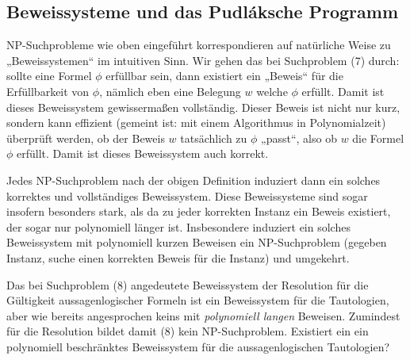 \subsection*{Beweissysteme und das Pudláksche Programm}

NP-Suchprobleme wie oben eingeführt korrespondieren auf natürliche Weise zu „Beweissystemen“ im intuitiven Sinn. Wir gehen das bei Suchproblem (7) durch: sollte eine Formel $\phi$ erfüllbar sein, dann existiert ein „Beweis“ für die Erfüllbarkeit von $\phi$, nämlich eben eine Belegung $w$ welche $\phi$ erfüllt. Damit ist dieses Beweissystem gewissermaßen vollständig.
Dieser Beweis ist nicht nur kurz, sondern kann effizient (gemeint ist: mit einem Algorithmus in Polynomialzeit) überprüft werden, ob der Beweis $w$ tatsächlich zu $\phi$ „passt“, also ob $w$ die Formel $\phi$ erfüllt. Damit ist dieses Beweissystem auch korrekt.

Jedes NP-Suchproblem nach der obigen Definition induziert dann ein solches korrektes und vollständiges Beweissystem. Diese Beweissysteme sind sogar insofern besonders stark, als da zu jeder korrekten Instanz ein Beweis existiert, der sogar nur polynomiell länger ist.
Insbesondere induziert ein solches Beweissystem mit polynomiell kurzen Beweisen ein NP-Suchproblem (gegeben Instanz, suche einen korrekten Beweis für die Instanz) und umgekehrt.

Das bei Suchproblem (8) angedeutete Beweissystem der Resolution für die Gültigkeit aussagenlogischer Formeln ist ein Beweissystem für die Tautologien, aber wie bereits angesprochen keins mit \emph{polynomiell langen} Beweisen. Zumindest für die Resolution bildet damit (8) kein NP-Suchproblem. 
Existiert ein ein polynomiell beschränktes Beweissystem für die aussagenlogischen Tautologien?

